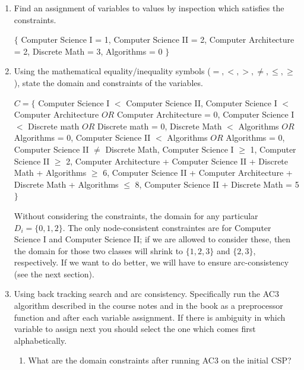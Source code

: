 \documentclass[12pt]{article}
\begin{document}
\begin{enumerate}

\item Find an assignment of variables to values by inspection which
  satisfies the constraints.

 \begin{solution}
$\{$ Computer Science I = 1, Computer Science II = 2, Computer Architecture = 2, Discrete Math = 3, Algorithms = 0 $\}$
 \end{solution}

\item Using the mathematical equality/inequality symbols ($=, <, >,
  \neq, \leq, \geq$), state the domain and constraints of the
  variables.

 \begin{solution}
$C = \{$ Computer Science I $<$ Computer Science II, Computer Science I $<$ Computer Architecture $OR$ Computer Architecture = 0, Computer Science I $<$ Discrete math $OR$ Discrete math = 0, Discrete Math $<$ Algorithms $OR$ Algorithms = 0, Computer Science II $<$ Algorithms $OR$ Algorithms = 0, Computer Science II $\neq$ Discrete Math, Computer Science I $\ge$ 1, Computer Science II $\ge$ 2, Computer Architecture + Computer Science II + Discrete Math + Algorithms $\ge$ 6, Computer Science II + Computer Architecture + Discrete Math + Algorithms $\le$ 8, Computer Science II + Discrete Math = 5 $\}$ \newline

Without considering the constraints, the domain for any particular $D_i = \{0, 1, 2\}$. The only node-consistent constraintes are for Computer Science I and Computer Science II; if we are allowed to consider these, then the domain for those two classes will shrink to $\{ 1,2,3\}$ and $\{2, 3\}$, respectively. If we want to do better, we will have to ensure arc-consistency (see the next section).
\end{solution}

\item Using back tracking search and arc consistency. Specifically run
  the AC3 algorithm described in the course notes and in the book as a
  preprocessor function and after each variable assignment.  If there
  is ambiguity in which variable to assign next you should select the
  one which comes first alphabetically.

  \begin{enumerate}

  \item What are the domain constraints after running AC3 on the initial CSP?


\end{enumerate}
\end{enumerate}
\end{document}
